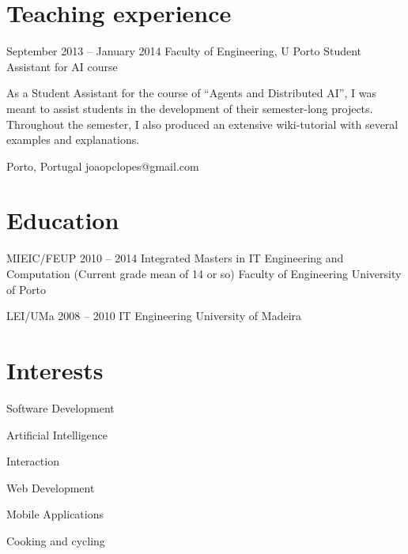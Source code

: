 \documentclass{tccv}
\begin{document}
\section{Teaching experience}

\begin{eventlist}

\item{September 2013 -- January 2014}
    {Faculty of Engineering, U Porto}
    {Student Assistant for AI course}

As a Student Assistant for the course of ``Agents and Distributed AI'', I was meant to assist students in the development of their semester-long projects. Throughout the semester, I also produced an extensive wiki-tutorial with several examples and explanations.

\end{eventlist}

    {Porto, Portugal}
    {joaopclopes@gmail.com}

\section{Education}

\begin{yearlist}

\item[MIEIC/FEUP]{2010 -- 2014}
    {Integrated Masters in IT Engineering and Computation}
    {(Current grade mean of 14 or so)
    Faculty of Engineering \newline University of Porto}

\item[LEI/UMa]{2008 -- 2010}
    {IT Engineering}
    {University of Madeira}
\end{yearlist}

\section{Interests}
\begin{factlist}
    \item{}{Software Development}
    \item{}{Artificial Intelligence}
    \item{}{Interaction}
    \item{}{Web Development}
    \item{}{Mobile Applications}
    \item{}{Cooking and cycling}
\end{factlist}
\end{document}
